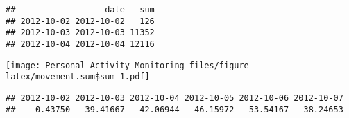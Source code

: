 \documentclass[]{article}
\newenvironment{Shaded}{\begin{snugshade}}{\end{snugshade}}
\newcommand{\KeywordTok}[1]{\textcolor[rgb]{0.13,0.29,0.53}{\textbf{#1}}}
\newcommand{\DataTypeTok}[1]{\textcolor[rgb]{0.13,0.29,0.53}{#1}}
\newcommand{\StringTok}[1]{\textcolor[rgb]{0.31,0.60,0.02}{#1}}
\newcommand{\OperatorTok}[1]{\textcolor[rgb]{0.81,0.36,0.00}{\textbf{#1}}}
\newcommand{\NormalTok}[1]{#1}
\begin{document}
\begin{verbatim}
##                  date   sum
## 2012-10-02 2012-10-02   126
## 2012-10-03 2012-10-03 11352
## 2012-10-04 2012-10-04 12116
\end{verbatim}

\begin{Shaded}
\end{Shaded}

\texttt{[image: Personal-Activity-Monitoring\_files/figure-latex/movement.sum\$sum-1.pdf]}

\begin{Shaded}
\end{Shaded}

\begin{verbatim}
## 2012-10-02 2012-10-03 2012-10-04 2012-10-05 2012-10-06 2012-10-07 
##    0.43750   39.41667   42.06944   46.15972   53.54167   38.24653
\end{verbatim}
\end{document}
